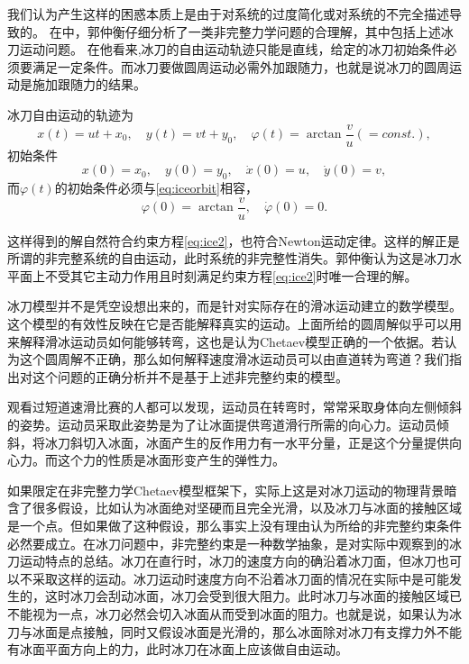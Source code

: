 \documentclass[A4,twoside]{ctexart}
\begin{document}
我们认为产生这样的困惑本质上是由于对系统的过度简化或对系统的不完全描述导致的。
在\cite{6}中，郭仲衡仔细分析了一类非完整力学问题的合理解，其中包括上述冰刀运动问题。
在他看来,冰刀的自由运动轨迹只能是直线，给定的冰刀初始条件必须要满足一定条件。而冰刀要做圆周运动必需外加跟随力，也就是说冰刀的圆周运动是施加跟随力的结果。

冰刀自由运动的轨迹为
\begin{equation}
  \label{eq:iceorbit}
  x(t) = u t +x_0,\quad y(t) = v t + y_0,\quad \varphi (t) = \arctan \frac{v}{u}(= const.),
\end{equation}
初始条件
\begin{equation}
  \label{eq:initial}
  x(0) = x_0,\quad y(0) = y_0,\quad \dot{x}(0) = u,\quad \dot{y}(0) = v,
\end{equation}
而$\varphi(t)$的初始条件必须与\eqref{eq:iceorbit}相容，
\begin{equation}
  \label{eq:initial2}
  \varphi(0) = \arctan \frac{v}{u},\quad \dot{\varphi}(0) = 0.
\end{equation}

这样得到的解自然符合约束方程\eqref{eq:ice2}，也符合Newton运动定律。这样的解正是所谓的非完整系统的自由运动，此时系统的非完整性消失\supercite{8}。郭仲衡认为这是冰刀水平面上不受其它主动力作用且时刻满足约束方程\eqref{eq:ice2}时唯一合理的解\supercite{6}。

冰刀模型并不是凭空设想出来的，而是针对实际存在的滑冰运动建立的数学模型。这个模型的有效性反映在它是否能解释真实的运动。上面所给的圆周解似乎可以用来解释滑冰运动员如何能够转弯，这也是认为Chetaev模型正确的一个依据。若认为这个圆周解不正确，那么如何解释速度滑冰运动员可以由直道转为弯道？我们指出对这个问题的正确分析并不是基于上述非完整约束的模型。

观看过短道速滑比赛的人都可以发现，运动员在转弯时，常常采取身体向左侧倾斜的姿势。运动员采取此姿势是为了让冰面提供弯道滑行所需的向心力。运动员倾斜，将冰刀斜切入冰面，冰面产生的反作用力有一水平分量，正是这个分量提供向心力。而这个力的性质是冰面形变产生的弹性力。

如果限定在非完整力学Chetaev模型框架下，实际上这是对冰刀运动的物理背景暗含了很多假设，比如认为冰面绝对坚硬而且完全光滑，以及冰刀与冰面的接触区域是一个点。但如果做了这种假设，那么事实上没有理由认为所给的非完整约束条件必然要成立。在冰刀问题中，非完整约束是一种数学抽象，是对实际中观察到的冰刀运动特点的总结。冰刀在直行时，冰刀的速度方向的确沿着冰刀面，但冰刀也可以不采取这样的运动。冰刀运动时速度方向不沿着冰刀面的情况在实际中是可能发生的，这时冰刀会刮动冰面，冰刀会受到很大阻力。此时冰刀与冰面的接触区域已不能视为一点，冰刀必然会切入冰面从而受到冰面的阻力。也就是说，如果认为冰刀与冰面是点接触，同时又假设冰面是光滑的，那么冰面除对冰刀有支撑力外不能有冰面平面方向上的力，此时冰刀在冰面上应该做自由运动。
\end{document}

